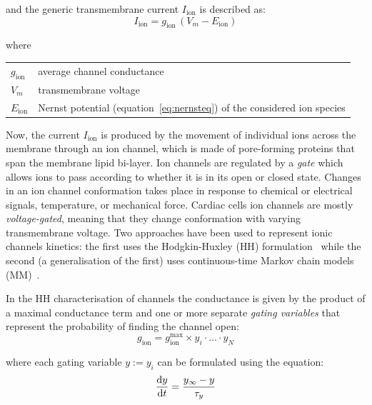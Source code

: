\vspace{0.5cm}
\noindent
and the generic transmembrane current $I_{\textrm{ion}}$ is described as:
%
\begin{equation}
    I_{\textrm{ion}} = g_{\textrm{ion}}\,(V_m-E_{\textrm{ion}})
\end{equation}

\noindent
where

\vspace{0.2cm}
\begin{tabular}{ll}
    $g_{\textrm{ion}}$ & average channel conductance \\
    $V_m$ & transmembrane voltage \\
    $E_\textrm{ion}$ & Nernst potential (equation~\eqref{eq:nernsteq}) of the considered ion species
\end{tabular}

\vspace{0.5cm}
Now, the current $I_{\textrm{ion}}$ is produced by the movement of individual ions across the membrane through an ion channel, which is made of pore-forming proteins that span the membrane lipid bi-layer. Ion channels are regulated by a \textit{gate} which allows ions to pass according to whether it is in its open or closed state. Changes in an ion channel conformation takes place in response to chemical or electrical signals, temperature, or mechanical force. Cardiac cells ion channels are mostly \textit{voltage-gated}, meaning that they change conformation with varying transmembrane voltage. Two approaches have been used to represent ionic channels kinetics: the first uses the Hodgkin-Huxley (\acs{HH}) formulation~\cite{Hodgkin:1952} while the second (a generalisation of the first) uses continuous-time Markov chain models (\acs{MM})~\cite{Fink:2009}.

\vspace{0.2cm}
In the HH characterisation of channels the conductance is given by the product of a maximal conductance term and one or more separate \textit{gating variables} that represent the probability of finding the channel open:
%
\begin{equation}
    g_{\textrm{ion}} = g_{\textrm{ion}}^{\textrm{max}}\times y_i\cdot\dots\cdot y_N
\end{equation}

\noindent
where each gating variable $y:=y_i$ can be formulated using the equation:
%
\begin{equation}
    \dfrac{\mathrm{d}{y}}{\mathrm{d}{t}} = \frac{y_{\infty}-y}{\tau_y}
\end{equation}

